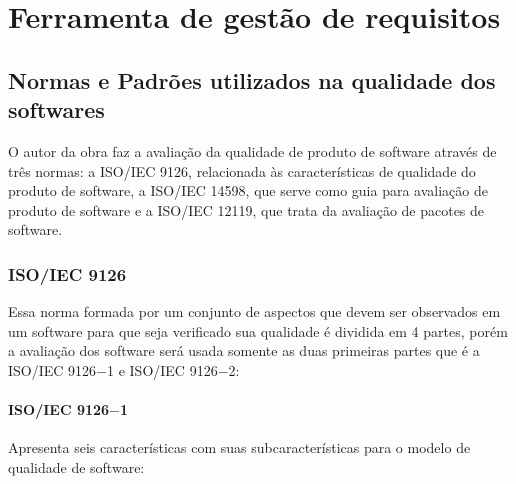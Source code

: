 \chapter{Ferramenta de gestão de requisitos}

\section{Normas e Padrões utilizados na qualidade dos softwares}

  O autor da obra faz a avaliação da qualidade de produto de software através de três normas: a ISO/IEC 9126, relacionada às
  características de qualidade do produto de software, a ISO/IEC 14598, que serve como guia para avaliação de produto de software
  e a ISO/IEC 12119, que trata da avaliação de pacotes de software.

\subsection{ISO/IEC 9126}

  Essa norma formada por um conjunto de aspectos que devem ser observados em um software para que seja verificado sua qualidade é
  dividida em 4 partes, porém a avaliação dos software será usada somente as duas primeiras partes que é a ISO/IEC 9126$-$1 e
  ISO/IEC 9126$-$2:

\subsubsection{ISO/IEC 9126$-$1}

  Apresenta seis características com suas subcaracterísticas para o modelo de qualidade de software:

